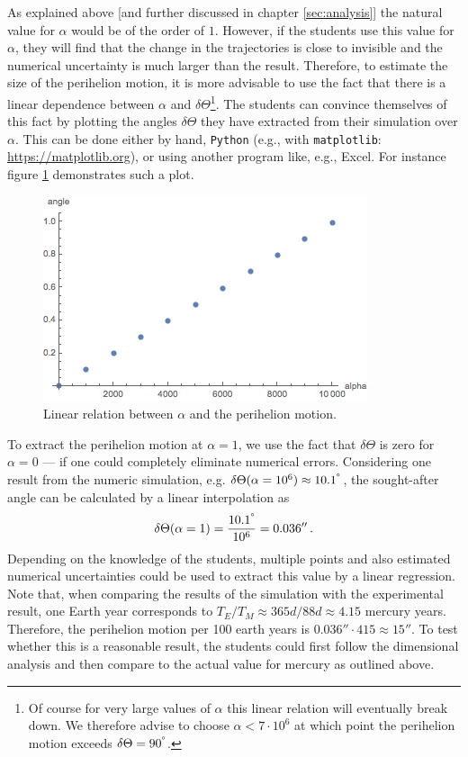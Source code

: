 \documentclass[12pt, UK english]{iopart}
\newcommand{\python}[0]{\texttt{Python}}
\begin{document}
As explained above [and further discussed in chapter \ref{sec:analysis}] the natural value for $\alpha$ would be of the order of $1$.
However, if the students use this value for $\alpha$, they will find that the change in the trajectories is close to invisible and the numerical uncertainty is much larger than the result.
Therefore, to estimate the size of the perihelion motion, it is more advisable to use the fact that there is a linear dependence between $\alpha$ and $\delta \Theta$\footnote{%
	Of course for very large values of $\alpha$ this linear relation will eventually break down.
	We therefore advise to choose $\alpha<7\cdot 10^6$ at which point the perihelion motion exceeds $\delta \Theta=90^{\degree}$.
}.
The students can convince themselves of this fact by plotting the angles $\delta \Theta$ they have extracted from their simulation over $\alpha$.
This can be done either by hand, \python{} (e.g., with \texttt{matplotlib}: \url{https://matplotlib.org}), or using another program like, e.g., Excel.
For instance figure \ref{fig:AlphaAngle} demonstrates such a plot.

\begin{figure}[htb]
	\centering
	\includegraphics[width=.8\textwidth]{figs/AlphaAngle.png}
	\caption{\label{fig:AlphaAngle} Linear relation between $\alpha$ and the perihelion motion.}
\end{figure}

To extract the perihelion motion at $\alpha = 1$, we use the fact that $\delta \Theta$ is zero for $\alpha =0$ --- if one could completely eliminate numerical errors.
Considering one result from the numeric simulation, e.g. $\delta\Theta(\alpha = 10^6) \approx 10.1^{\degree}$, the sought-after angle can be calculated by a linear interpolation as
\begin{equation}
	\delta\Theta (\alpha=1) = \frac{10.1^{\degree}}{10^6} = 0.036''
	\, .
\end{equation}
Depending on the knowledge of the students, multiple points and also estimated numerical uncertainties could be used to extract this value by a linear regression.
Note that, when comparing the results of the simulation with the experimental result, one Earth year corresponds to $T_E/T_M \approx 365d/88d\approx 4.15$ mercury years.
Therefore, the perihelion motion per 100 earth years is $0.036''\cdot 415\approx 15''$.
To test whether this is a reasonable result, the students could first follow the dimensional analysis and then compare to the actual value for mercury as outlined above.
\end{document}
